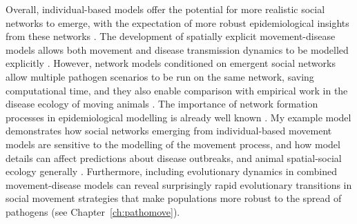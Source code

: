 Overall, individual-based models offer the potential for more realistic social networks to emerge, with the expectation of more robust epidemiological insights from these networks \citep[][]{lunn2021}.
The development of spatially explicit movement-disease models allows both movement and disease transmission dynamics to be modelled explicitly \citep{white2018b,white2018,scherer2020,gupte2022c}.
However, network models conditioned on emergent social networks allow multiple pathogen scenarios to be run on the same network, saving computational time, and they also enable comparison with empirical work in the disease ecology of moving animals \citep{wilber2022}.
The importance of network formation processes in epidemiological modelling is already well known \citep[][]{white2017,wilber2022}.
My example model demonstrates how social networks emerging from individual-based movement models are sensitive to the modelling of the movement process, and how model details can affect predictions about disease outbreaks, and animal spatial-social ecology generally \citep{webber2018,webber2022}.
Furthermore, including evolutionary dynamics in combined movement-disease models can reveal surprisingly rapid evolutionary transitions in social movement strategies that make populations more robust to the spread of pathogens (see Chapter~\ref{ch:pathomove}).

{ \begin{center}  \end{center} }

\vfill

\clearpage
